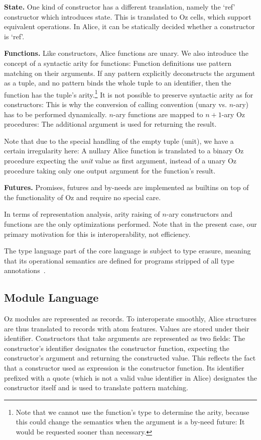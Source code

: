 \documentclass{entcs}
\begin{document}
{\bfseries State.}
One kind of constructor has a different translation, namely the `ref'
constructor which introduces state.  This is translated to Oz cells, which
support equivalent operations.  In Alice, it can be statically decided
whether a constructor is `ref'.

{\bfseries Functions.}
Like constructors, Alice functions are unary.  We also introduce the concept
of a syntactic arity for functions:  Function definitions use pattern matching
on their arguments.  If any pattern explicitly deconstructs the argument as
a tuple, and no pattern binds the whole tuple to an identifier, then the
function has the tuple's arity.\footnote{Note that we cannot use the function's
type to determine the arity, because this could change the semantics when the
argument is a by-need future:  It would be requested sooner than necessary.}
It is not possible to preserve syntactic arity as for constructors:  This
is why the conversion of calling convention (unary vs. $n$-ary) has to be
performed dynamically.  $n$-ary functions are mapped to $n + 1$-ary Oz
procedures:  The additional argument is used for returning the result.

Note that due to the special handling of the empty tuple (unit), we have
a certain irregularity here:  A nullary Alice function is translated to
a binary Oz procedure expecting the \emph{unit} value as first argument,
instead of a unary Oz procedure taking only one output argument for the
function's result.

{\bfseries Futures.}
Promises, futures and by-needs are implemented as builtins on top of the
functionality of Oz and require no special care.

In terms of representation analysis, arity raising of $n$-ary constructors
and functions are the only optimizations performed.  Note that in the present
case, our primary motivation for this is interoperability, not efficiency.

The type language part of the core language is subject to type erasure,
meaning that its operational semantics are defined for programs stripped
of all type annotations~\cite[Section~6.1]{SMLDefinition}.

\subsection{Module Language}

Oz modules are represented as records.  To interoperate smoothly, Alice
structures are thus translated to records with atom features.  Values
are stored under their identifier.  Constructors that take arguments are
represented as two fields:  The constructor's identifier designates the
constructor function, expecting the constructor's argument and returning
the constructed value.  This reflects the fact that a constructor used as
expression is the constructor function. Its identifier prefixed with a
quote (which is not a valid value identifier in Alice) designates the
constructor itself and is used to translate pattern matching.
\end{document}
